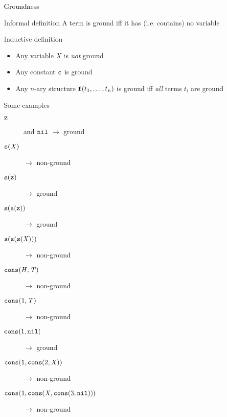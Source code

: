 \documentclass[presentation]{beamer}\mode<presentation>{\usetheme{AMSBolognaFC}}
\begin{document}

\begin{frame}[allowframebreaks]{Groundness}
    \begin{block}{Informal definition}\centering
        A term is \alert{ground} iff it has (i.e. contains) no variable
    \end{block}

    \begin{alertblock}{Inductive definition}
        \begin{itemize}
            \item Any variable $X$ is \emph{not} ground
            \item Any constant $\mathtt{c}$ is ground
            \item Any $n$-ary structure $\mathtt{f}(t_1, \ldots, t_n)$ is ground iff \emph{all} terms $t_i$ are ground
        \end{itemize}
    \end{alertblock}

    \begin{exampleblock}{Some examples}
        \begin{description}
            \item[$\mathtt{z}$] and \alert{$\mathtt{nil}$} $\rightarrow$ ground
            \item[$\mathtt{s}(\mathit{X})$] $\rightarrow$ non-ground
            \item[$\mathtt{s}(\mathtt{z})$] $\rightarrow$ ground
            \item[$\mathtt{s}(\mathtt{s}(\mathtt{z}))$] $\rightarrow$ ground
            \item[$\mathtt{s}(\mathtt{s}(\mathtt{s}(\mathit{X})))$] $\rightarrow$ non-ground
            \item[$\mathtt{cons}(\mathit{H}, \mathit{T})$] $\rightarrow$ non-ground
            \item[$\mathtt{cons}(1, \mathit{T})$] $\rightarrow$ non-ground
            \item[$\mathtt{cons}(1, \mathtt{nil})$] $\rightarrow$ ground
            \item[$\mathtt{cons}(1, \mathtt{cons}(2, \mathit{X}))$] $\rightarrow$ non-ground
            \item[$\mathtt{cons}(1, \mathtt{cons}(\mathit{X}, \mathtt{cons}(3, \mathtt{nil})))$] $\rightarrow$ non-ground
        \end{description}
    \end{exampleblock}
\end{frame}
\end{document}
